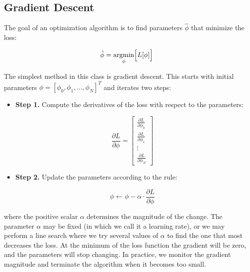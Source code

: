 \subsection{Gradient Descent}
The goal of an optimization algorithm is to find parameters $\hat{\phi}$ that minimize the loss:

\begin{equation}
    \hat{\phi}=\underset{\phi}{\text{argmin}}\Bigl[L[\phi]\Bigr]
\end{equation}

\noindent The simplest method in this class is gradient descent. This starts with initial parameters $\phi = [\phi_{0}, \phi_{1}, . . . , \phi_{N} ]^{T}$ and iterates two steps:

\begin{itemize}
    \item \textbf{Step 1.} Compute the derivatives of the loss with respect to the parameters:

    \begin{equation}
        \frac{\partial L}{\partial \phi}=\left[\begin{array}{c}\frac{\partial L}{\partial \phi_{0}} \\ \frac{\partial L}{\partial \phi_{1}} \\ \vdots \\ \frac{\partial L}{\partial \phi_{N}}\end{array}\right]
    \end{equation}

    \item \textbf{Step 2.} Update the parameters according to the rule:

    
    \begin{equation}
        \phi \longleftarrow \phi - \alpha \cdot \frac{\partial L}{\partial \phi}
    \end{equation}
\end{itemize}

\noindent where the positive scalar $\alpha$ determines the magnitude of the change. The parameter $\alpha$ may be fixed (in which we call it a learning rate), or we may perform a line search where we try several values of $\alpha$ to find the one that most decreases the loss. At the minimum of the loss function the gradient will be zero, and the parameters will stop changing. In practice, we monitor the gradient magnitude and terminate the algorithm when it becomes too small.

